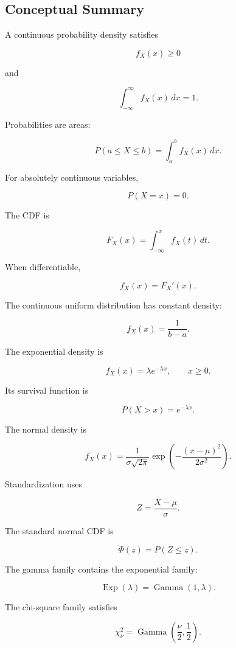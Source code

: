 \subsection{Conceptual Summary}
\label{subsec:continuous-distributions-summary}

A continuous probability density satisfies

\[
\boxed{
f_X(x)\geq0
}
\]

and

\[
\boxed{
\int_{-\infty}^{\infty}
f_X(x)\,dx
=
1.
}
\]

Probabilities are areas:

\[
\boxed{
P(a\leq X\leq b)
=
\int_a^b f_X(x)\,dx.
}
\]

For absolutely continuous variables,

\[
\boxed{
P(X=x)=0.
}
\]

The CDF is

\[
\boxed{
F_X(x)
=
\int_{-\infty}^{x}
f_X(t)\,dt.
}
\]

When differentiable,

\[
\boxed{
f_X(x)
=
F_X'(x).
}
\]

The continuous uniform distribution has constant density:

\[
\boxed{
f_X(x)
=
\frac1{b-a}.
}
\]

The exponential density is

\[
\boxed{
f_X(x)
=
\lambda e^{-\lambda x},
\qquad
x\geq0.
}
\]

Its survival function is

\[
\boxed{
P(X>x)=e^{-\lambda x}.
}
\]

The normal density is

\[
\boxed{
f_X(x)
=
\frac1{\sigma\sqrt{2\pi}}
\exp
\left(
-\frac{(x-\mu)^2}{2\sigma^2}
\right).
}
\]

Standardization uses

\[
\boxed{
Z
=
\frac{X-\mu}{\sigma}.
}
\]

The standard normal CDF is

\[
\boxed{
\Phi(z)=P(Z\leq z).
}
\]

The gamma family contains the exponential family:

\[
\boxed{
\operatorname{Exp}(\lambda)
=
\operatorname{Gamma}(1,\lambda).
}
\]

The chi-square family satisfies

\[
\boxed{
\chi^2_\nu
=
\operatorname{Gamma}
\left(
\frac{\nu}{2},
\frac12
\right).
}
\]

